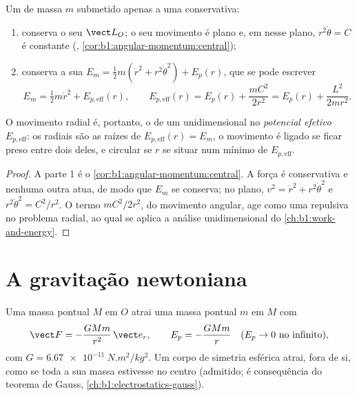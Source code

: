 \begin{theorem}\label{thm:b1:central-forces:reduction}
Um  de massa $m$ submetido apenas a uma  conservativa:
\begin{enumerate}
  \item conserva o seu  $\vect L_O$; o seu movimento é plano e,
        em  nesse plano, $r^2\dot\theta = C$ é
        constante (, \cref{cor:b1:angular-momentum:central});
  \item conserva a sua  $E_m = \tfrac12 m(\dot r^2 + r^2\dot\theta^2)
        + E_p(r)$, que se pode escrever
        \[
        E_m = \tfrac12 m\dot r^2 + E_{p,\mathrm{eff}}(r), \qquad
        E_{p,\mathrm{eff}}(r) = E_p(r) + \frac{mC^2}{2r^2} = E_p(r) + \frac{L^2}{2mr^2} .
        \]
\end{enumerate}
O movimento radial é, portanto, o de um  unidimensional no
\emph{potencial efetivo} $E_{p,\mathrm{eff}}$: os 
radiais são as raízes de $E_{p,\mathrm{eff}}(r) = E_m$, o movimento é
ligado se ficar preso entre dois deles, e circular se $r$ se situar num
mínimo de $E_{p,\mathrm{eff}}$.
\end{theorem}

\begin{proof}
A parte 1 é o \cref{cor:b1:angular-momentum:central}. A força é
conservativa e nenhuma outra atua, de modo que $E_m$ se conserva; no
plano, $v^2 = \dot r^2 + r^2\dot\theta^2$ e $r^2\dot\theta^2 = C^2/r^2$.
O termo $mC^2/2r^2$,  do movimento angular, age como uma
\emph{} repulsiva no problema radial, ao qual se aplica
a análise unidimensional do \cref{ch:b1:work-and-energy}.
\end{proof}

\section{A gravitação newtoniana}

\begin{definition}\label{def:b1:central-forces:gravitation}
Uma massa pontual $M$ em $O$ atrai uma massa pontual $m$ em $M$ com
\[
\vect F = -\frac{GMm}{r^2}\,\vect e_r, \qquad E_p = -\frac{GMm}{r} \quad (E_p \to 0 \text{ no infinito}),
\]
com $G = \qty{6.67e-11}{N.m^2/kg^2}$. Um corpo de simetria esférica atrai,
fora de si, como se toda a sua massa estivesse no centro (admitido; é
consequência do teorema de Gauss, \cref{ch:b1:electrostatics-gauss}).
\end{definition}

